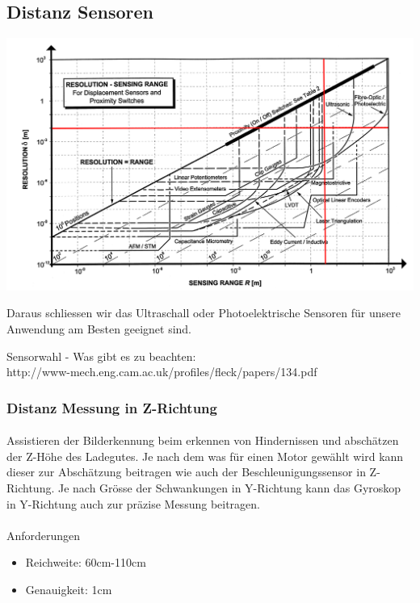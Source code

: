 \documentclass[a4paper]{report}
\begin{document}
\subsection{Distanz Sensoren}
\includegraphics[width=\textwidth]{distance-sensors}

Daraus schliessen wir das Ultraschall oder Photoelektrische Sensoren für unsere Anwendung am Besten geeignet sind.

Sensorwahl - Was gibt es zu beachten:\\
http://www-mech.eng.cam.ac.uk/profiles/fleck/papers/134.pdf

\subsubsection{Distanz Messung in Z-Richtung}
\paragraph{} Assistieren der Bilderkennung beim erkennen von Hindernissen und
abschätzen der Z-Höhe des Ladegutes. Je nach dem was für einen Motor gewählt
wird kann dieser zur Abschätzung beitragen wie auch der Beschleunigungssensor
in Z-Richtung. Je nach Grösse der Schwankungen in Y-Richtung kann das Gyroskop
in Y-Richtung auch zur präzise Messung beitragen.

\paragraph{} Anforderungen
\begin{itemize}
\item Reichweite: 60cm-110cm
\item Genauigkeit: 1cm
\end{itemize}
\end{document}
